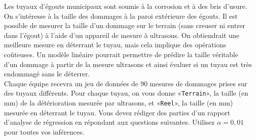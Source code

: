 \begin{questions}
\begin{solution}
\end{solution}

\newpage

\question\label{prog}
Les tuyaux d'égouts municipaux sont soumis à la corrosion et à des bris d'usure.  On s'intéresse à la taille des dommages à la paroi extérieure des égouts. Il est possible de mesurer la taille d'un dommage sur le terrain (sans creuser ni entrer dans l'égout) à l'aide d'un appareil de mesure à ultrasons. On obtiendrait une meilleure mesure en déterrant le tuyau, mais cela implique des opérations coûteuses. %
Un modèle linéaire pourrait permettre de prédire la taille véritable d'un dommage  à partir de la mesure ultrasons et ainsi évaluer si un tuyau est très endommagé sans le déterrer. \\

Chaque équipe recevra un jeu de données de 90 mesures de dommages prises sur des tuyaux différents. %
Pour chaque tuyau, on vous donne «\texttt{Terrain}», la taille (en mm) de la détérioration mesurée par ultrasons, et «\texttt{Reel}», la taille (en mm) mesurée en déterrant le tuyau.  Vous devez rédiger des parties d'un rapport d'analyse de régression en répondant aux questions suivantes. Utilisez $\alpha = 0,01$ pour toutes vos inférences. \\


\end{questions}
